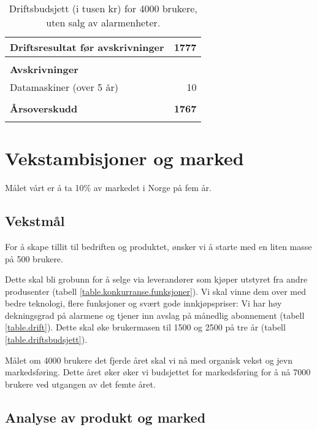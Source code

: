 \begin{table}
\begin{tabular}{lr}
    \\
    \textbf{Driftsresultat før avskrivninger}         &  \textbf{1777} \\
    \hline
    \\
    \textbf{Avskrivninger}                            & \\
    Datamaskiner (over 5 år)                          &    10 \\
    \\
    \textbf{Årsoverskudd}                             &  \textbf{1767} \\
    \hline
    \\
  \end{tabular}
  \caption{Driftsbudsjett (i tusen kr) for 4000 brukere, uten salg av alarmenheter.}
  \label{table.drift}
\end{table}

\section{Vekstambisjoner og marked}

Målet vårt er å ta 10\% av markedet i Norge på fem år.

\subsection{Vekstmål}


For å skape tillit til bedriften og produktet, ønsker vi å starte med en liten
masse på 500 brukere.

Dette skal bli grobunn for å selge via leverandører som kjøper utstyret fra
andre produsenter (tabell \vref{table.konkurranse.funksjoner}).  Vi skal vinne
dem over med bedre teknologi, flere funksjoner og svært gode innkjøpspriser: Vi
har høy dekningsgrad på alarmene og tjener inn avslag på månedlig abonnement
(tabell \vref{table.drift}).  Dette skal øke brukermasen til 1500 og 2500 på
tre år (tabell \vref{table.driftsbudsjett}).

Målet om 4000 brukere det fjerde året skal vi nå med organisk vekst og jevn
markedsføring. Dette året øker øker vi budsjettet for markedsføring for å nå
7000 brukere ved utgangen av det femte året.

\subsection{Analyse av produkt og marked}

